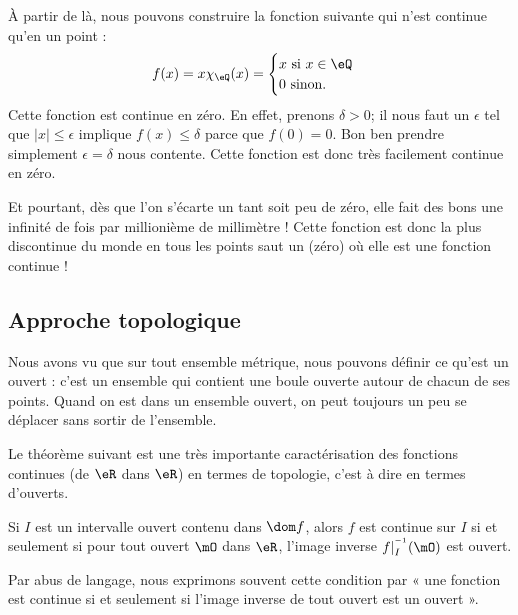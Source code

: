 À partir de là, nous pouvons construire la fonction suivante qui n'est continue qu'en un point :
\[
  f(x)=x\chi_{\eQ}(x)=
\begin{cases}
x\text{ si }x\in\eQ\\
0\text{ sinon.}
\end{cases}
\]
Cette fonction est continue en zéro. En effet, prenons $\delta>0$; il nous faut un $\epsilon$ tel que $| x |\leq\epsilon$ implique $f(x)\leq \delta$ parce que $f(0)=0$. Bon ben prendre simplement $\epsilon=\delta$ nous contente. Cette fonction est donc très facilement continue en zéro.

Et pourtant, dès que l'on s'écarte un tant soit peu de zéro, elle fait des bons une infinité de fois par millionième de millimètre ! Cette fonction est donc la plus discontinue du monde en tous les points saut un (zéro) où elle est une fonction continue !

\subsection{Approche topologique}

Nous avons vu que sur tout ensemble métrique, nous pouvons définir ce qu'est un ouvert : c'est un ensemble qui contient une boule ouverte autour de chacun de ses points. Quand on est dans un ensemble ouvert, on peut toujours un peu se déplacer sans sortir de l'ensemble.

Le théorème suivant est une très importante caractérisation des fonctions continues (de $\eR$ dans $\eR$) en termes de topologie, c'est à dire en termes d'ouverts.

\begin{theorem}     \label{ThoContInvOuvert}
Si $I$ est un intervalle ouvert contenu dans $\dom f$, alors $f$ est continue sur $I$ si et seulement si pour tout ouvert $\mO$ dans $\eR$, l'image inverse $f|_I^{^{-1}}(\mO)$ est ouvert.
\end{theorem}

Par abus de langage, nous exprimons souvent cette condition par « une fonction est continue si et seulement si l'image inverse de tout ouvert est un ouvert ».

